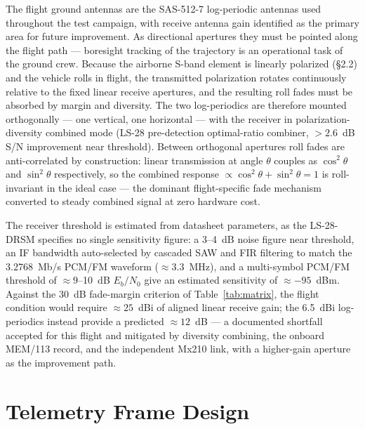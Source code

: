 \documentclass[12pt,letterpaper]{article}
\begin{document}
The flight ground antennas are the SAS-512-7 log-periodic antennas used
throughout the test campaign, with receive antenna gain identified as the
primary area for future improvement. As directional apertures they must be
pointed along the flight path --- boresight tracking of the trajectory is
an operational task of the ground crew. Because the airborne S-band element
is linearly polarized (\S2.2) and the vehicle rolls in flight, the
transmitted polarization rotates continuously relative to the fixed linear
receive apertures, and the resulting roll fades must be absorbed by margin
and diversity. The two log-periodics are therefore mounted orthogonally --- one
vertical, one horizontal --- with the receiver in polarization-diversity
combined mode (LS-28 pre-detection optimal-ratio combiner, ${>}2.6$~dB
S/N improvement near threshold). Between orthogonal apertures roll fades
are anti-correlated by construction: linear transmission at angle
$\theta$ couples as $\cos^2\theta$ and $\sin^2\theta$ respectively,
so the combined response $\propto \cos^2\theta + \sin^2\theta = 1$
is roll-invariant in the ideal case --- the dominant flight-specific fade
mechanism converted to steady combined signal at zero hardware
cost.

The receiver threshold is estimated from datasheet parameters, as the
LS-28-DRSM specifies no single sensitivity figure: a 3--4~dB noise figure
near threshold, an IF bandwidth auto-selected by cascaded SAW and FIR
filtering to match the 3.2768~Mb/s PCM/FM waveform
(${\approx}3.3$~MHz), and a multi-symbol PCM/FM threshold of
${\approx}9$--10~dB $E_b/N_0$ give an estimated sensitivity of
${\approx}{-95}$~dBm. Against the 30~dB fade-margin criterion of
Table~\ref{tab:matrix}, the flight condition would require
${\approx}25$~dBi of aligned linear receive gain; the 6.5~dBi
log-periodics instead provide a predicted ${\approx}12$~dB --- a
documented shortfall accepted for this flight and mitigated by diversity
combining, the onboard MEM/113 record, and the independent Mx210 link,
with a higher-gain aperture as the improvement path.

\section{Telemetry Frame Design}\label{sec:frame}
\end{document}
